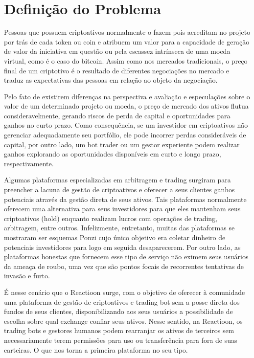 \documentclass[
	article,			%
	12pt,				%
	oneside,			%
	a4paper,			%
	brazil,				%
	english,
	sumario=tradicional
	]{abntex2}
\begin{document}
\section{Definição do Problema}

Pessoas que possuem criptoativos normalmente o fazem pois acreditam no projeto por trás de cada token ou coin e atribuem um valor para a capacidade de geração de valor da iniciativa em questão ou pela escassez intrínseca de uma moeda virtual, como é o caso do bitcoin. Assim como nos mercados tradicionais, o preço final de um criptotivo é o resultado de diferentes negociações no mercado e traduz as expectativas das pessoas em relação ao objeto da negociação.  

Pelo fato de existirem diferenças na perspectiva e avaliação e especulações sobre o valor de um determinado projeto ou moeda, o preço de mercado dos ativos flutua consideravelmente, gerando riscos de perda de capital e oportunidades para ganhos no curto prazo. Como consequência, se um investidor em criptoativos não gerenciar adequadamente seu portfólio, ele pode incorrer perdas consideráveis de capital, por outro lado, um bot trader ou um gestor experiente podem realizar ganhos explorando as oportunidades disponíveis em curto e longo prazo, respectivamente. 


Algumas plataformas especializadas em arbitragem e trading surgiram para preencher a lacuna de gestão de criptoativos e oferecer a seus clientes ganhos potenciais através da gestão direta de seus ativos. Tais plataformas normalmente oferecem uma alternativa para seus investidores para que eles mantenham seus criptoativos (hold) enquanto realizam lucros com operações de trading, arbitragem, entre outros. Infelizmente, entretanto, muitas das plataformas se mostraram ser esquemas Ponzi cujo único objetivo era coletar dinheiro de potenciais investidores para logo em seguida desaparecerem. Por outro lado, as plataformas honestas que fornecem esse tipo de serviço não eximem seus usuários da ameaça de roubo, uma vez que são pontos focais de recorrentes tentativas de invasão e furto. 

É nesse cenário que o Reactioon surge, com o objetivo de oferecer à comunidade uma plataforma de gestão de criptoativos e trading bot sem a posse direta dos fundos de seus clientes, disponibilizando aos seus usuários a possibilidade de escolha sobre qual exchange confiar seus ativos. Nesse sentido, na Reactioon, os trading bots e gestores humanos podem rearranjar os ativos de terceiros sem necessariamente terem permissões para uso ou transferência para fora de suas carteiras. O que nos torna a primeira plataforma no seu tipo.  
\end{document}
